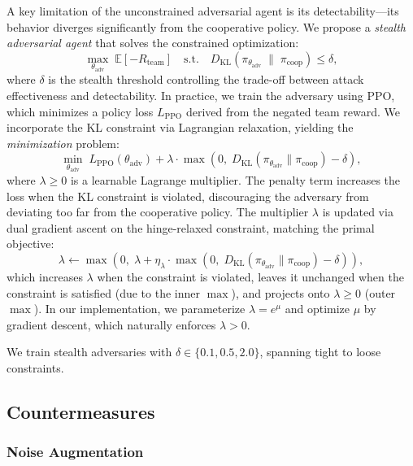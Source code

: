 \documentclass[12pt,a4paper]{article}
\begin{document}
A key limitation of the unconstrained adversarial agent is its detectability---its behavior diverges significantly from the cooperative policy. We propose a \emph{stealth adversarial agent} that solves the constrained optimization:
\begin{equation}
    \max_{\theta_\text{adv}} \; \mathbb{E}\left[-R_\text{team}\right] \quad \text{s.t.} \quad D_\text{KL}\left(\pi_{\theta_\text{adv}} \;\|\; \pi_\text{coop}\right) \leq \delta,
\end{equation}
where $\delta$ is the stealth threshold controlling the trade-off between attack effectiveness and detectability. In practice, we train the adversary using PPO, which minimizes a policy loss $L_\text{PPO}$ derived from the negated team reward. We incorporate the KL constraint via Lagrangian relaxation, yielding the \emph{minimization} problem:
\begin{equation}
    \min_{\theta_\text{adv}} \; L_\text{PPO}(\theta_\text{adv}) + \lambda \cdot \max\left(0, \; D_\text{KL}(\pi_{\theta_\text{adv}} \| \pi_\text{coop}) - \delta\right),
\end{equation}
where $\lambda \geq 0$ is a learnable Lagrange multiplier. The penalty term increases the loss when the KL constraint is violated, discouraging the adversary from deviating too far from the cooperative policy. The multiplier $\lambda$ is updated via dual gradient ascent on the hinge-relaxed constraint, matching the primal objective:
\begin{equation}
    \lambda \leftarrow \max\!\left(0,\; \lambda + \eta_\lambda \cdot \max\!\left(0,\; D_\text{KL}(\pi_{\theta_\text{adv}} \| \pi_\text{coop}) - \delta\right)\right),
\end{equation}
which increases $\lambda$ when the constraint is violated, leaves it unchanged when the constraint is satisfied (due to the inner $\max$), and projects onto $\lambda \geq 0$ (outer $\max$). In our implementation, we parameterize $\lambda = e^{\mu}$ and optimize $\mu$ by gradient descent, which naturally enforces $\lambda > 0$.

We train stealth adversaries with $\delta \in \{0.1, 0.5, 2.0\}$, spanning tight to loose constraints.

\subsection{Countermeasures}

\subsubsection{Noise Augmentation}
\end{document}
